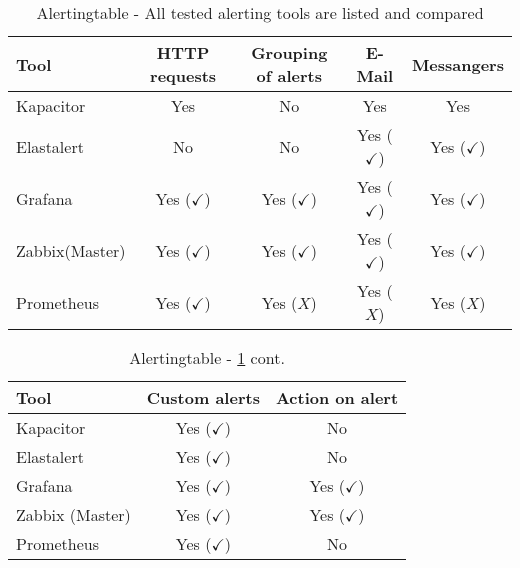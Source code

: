 \begin{table}
	\centering
	
	\begin{tabular}{lcccc}
		\hline
Tool & HTTP requests & Grouping of alerts & E-Mail & Messangers \\
\hline
Kapacitor & Yes  & No & Yes & Yes \\
Elastalert & No & No & Yes ($ \checkmark $) & Yes ($ \checkmark $) \\
Grafana & Yes ($ \checkmark $) & Yes ($ \checkmark $) & Yes ($ \checkmark $) & Yes ($ \checkmark $) \\
Zabbix(Master) & Yes ($ \checkmark $) & Yes ($ \checkmark $) & Yes ($ \checkmark $) & Yes ($ \checkmark $) \\
Prometheus & Yes ($ \checkmark $) & Yes ($ X $) & Yes ($ X $) & Yes ($ X $)\\
		\hline
	\end{tabular}
	\caption{Alertingtable - All tested alerting tools are listed and compared}
	\label{tab:Alerting}
\end{table}

\begin{table}
	\centering
	\begin{tabular}{lcc}
		\hline
		Tool & Custom alerts & Action on alert \\
		\hline
		Kapacitor                    & Yes ($ \checkmark $)       & No\\
		Elastalert                   & Yes ($ \checkmark $) & No\\
		Grafana                      & Yes ($ \checkmark $)          & Yes ($ \checkmark $)\\
		Zabbix (Master) & Yes ($ \checkmark $) & Yes ($ \checkmark $)\\
		Prometheus & Yes ($ \checkmark $) & No \\
		\hline 
	\end{tabular}
	\caption{Alertingtable - \cref{tab:Alerting} cont.}
	\label{tab:Alertingcont}
\end{table}

